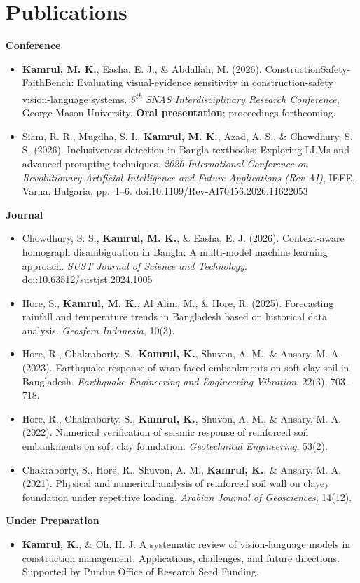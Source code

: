 \documentclass[letterpaper,10pt]{article}
\newcommand{\resumeItem}[1]{\item\small{#1 \vspace{-2pt}}}
\newcommand{\bulletList}{\begin{itemize}[leftmargin=0.15in, itemsep=1pt]}
\newcommand{\bulletListEnd}{\end{itemize}}
\begin{document}
\section{Publications}
\textbf{\small Conference}
\bulletList
  \resumeItem{\textbf{Kamrul, M. K.}, Easha, E. J., \& Abdallah, M. (2026). ConstructionSafety-FaithBench: Evaluating visual-evidence
    sensitivity in construction-safety vision-language systems. \textit{5\textsuperscript{th} SNAS Interdisciplinary Research Conference},
    George Mason University. \textbf{Oral presentation}; proceedings forthcoming.}
  \resumeItem{Siam, R. R., Mugdha, S. I., \textbf{Kamrul, M. K.}, Azad, A. S., \& Chowdhury, S. S. (2026). Inclusiveness detection in
    Bangla textbooks: Exploring LLMs and advanced prompting techniques. \textit{2026 International Conference on Revolutionary Artificial
    Intelligence and Future Applications (Rev-AI)}, IEEE, Varna, Bulgaria, pp.\ 1--6. doi:10.1109/Rev-AI70456.2026.11622053}
\bulletListEnd
\textbf{\small Journal}
\bulletList
  \resumeItem{Chowdhury, S. S., \textbf{Kamrul, M. K.}, \& Easha, E. J. (2026). Context-aware homograph disambiguation in Bangla:
    A multi-model machine learning approach. \textit{SUST Journal of Science and Technology}. doi:10.63512/sustjst.2024.1005}
  \resumeItem{Hore, S., \textbf{Kamrul, M. K.}, Al Alim, M., \& Hore, R. (2025). Forecasting rainfall and temperature trends in Bangladesh
    based on historical data analysis. \textit{Geosfera Indonesia}, 10(3).}
  \resumeItem{Hore, R., Chakraborty, S., \textbf{Kamrul, K.}, Shuvon, A. M., \& Ansary, M. A. (2023). Earthquake response of wrap-faced
    embankments on soft clay soil in Bangladesh. \textit{Earthquake Engineering and Engineering Vibration}, 22(3), 703--718.}
  \resumeItem{Hore, R., Chakraborty, S., \textbf{Kamrul, K.}, Shuvon, A. M., \& Ansary, M. A. (2022). Numerical verification of seismic
    response of reinforced soil embankments on soft clay foundation. \textit{Geotechnical Engineering}, 53(2).}
  \resumeItem{Chakraborty, S., Hore, R., Shuvon, A. M., \textbf{Kamrul, K.}, \& Ansary, M. A. (2021). Physical and numerical analysis of
    reinforced soil wall on clayey foundation under repetitive loading. \textit{Arabian Journal of Geosciences}, 14(12).}
\bulletListEnd
\textbf{\small Under Preparation}
\bulletList
  \resumeItem{\textbf{Kamrul, K.}, \& Oh, H. J. A systematic review of vision-language models in construction management: Applications,
    challenges, and future directions. Supported by Purdue Office of Research Seed Funding.}
\bulletListEnd
\end{document}
